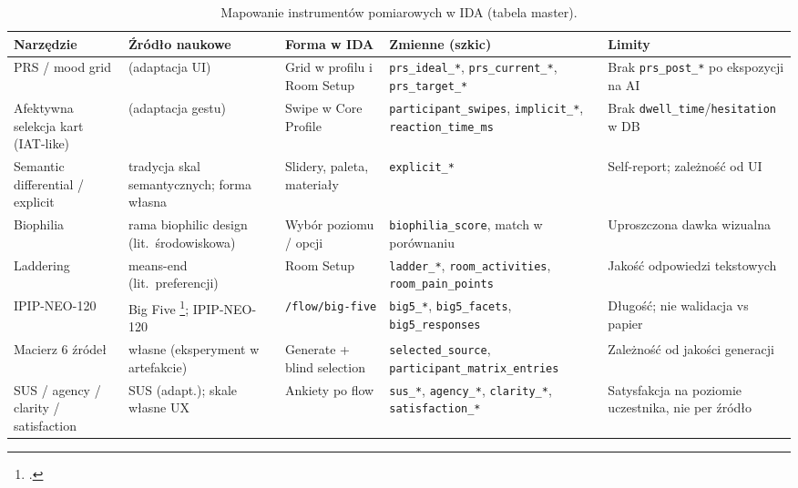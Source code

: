 \begin{table}[htbp]
  \centering
  \small
  \caption{Mapowanie instrumentów pomiarowych w IDA (tabela master).}
  \label{tab:ch06:instruments}
  \begin{tabular}{@{}p{2.2cm}p{2.6cm}p{3.0cm}p{2.8cm}p{2.8cm}@{}}
    \toprule
    Narzędzie & Źródło naukowe & Forma w IDA & Zmienne (szkic) & Limity \\
    \midrule
    PRS / mood grid &
      \textcite{hartig1997prs} (adaptacja UI) &
      Grid w profilu i Room Setup &
      \texttt{prs\_ideal\_*}, \texttt{prs\_current\_*}, \texttt{prs\_target\_*} &
      Brak \texttt{prs\_post\_*} po ekspozycji na AI \\
    \addlinespace
    Afektywna selekcja kart (IAT-like) &
      \textcite{greenwald1998iat} (adaptacja gestu) &
      Swipe w Core Profile &
      \texttt{participant\_swipes}, \texttt{implicit\_*}, \texttt{reaction\_time\_ms} &
      Brak \texttt{dwell\_time}/\texttt{hesitation} w DB \\
    \addlinespace
    Semantic differential / explicit &
      tradycja skal semantycznych; forma własna &
      Slidery, paleta, materiały &
      \texttt{explicit\_*} &
      Self-report; zależność od UI \\
    \addlinespace
    Biophilia &
      rama biophilic design (lit.\ środowiskowa) &
      Wybór poziomu / opcji &
      \texttt{biophilia\_score}, match w porównaniu &
      Uproszczona dawka wizualna \\
    \addlinespace
    Laddering &
      means-end (lit.\ preferencji) &
      Room Setup &
      \texttt{ladder\_*}, \texttt{room\_activities}, \texttt{room\_pain\_points} &
      Jakość odpowiedzi tekstowych \\
    \addlinespace
    IPIP-NEO-120 &
      Big Five \footcite{john2008bigfive}; IPIP-NEO-120 &
      \texttt{/flow/big-five} &
      \texttt{big5\_*}, \texttt{big5\_facets}, \texttt{big5\_responses} &
      Długość; nie walidacja vs papier \\
    \addlinespace
    Macierz 6 źródeł &
      własne (eksperyment w artefakcie) &
      Generate + blind selection &
      \texttt{selected\_source}, \texttt{participant\_matrix\_entries} &
      Zależność od jakości generacji \\
    \addlinespace
    SUS / agency / clarity / satisfaction &
      SUS (adapt.); skale własne UX &
      Ankiety po flow &
      \texttt{sus\_*}, \texttt{agency\_*}, \texttt{clarity\_*}, \texttt{satisfaction\_*} &
      Satysfakcja na poziomie uczestnika, nie per źródło \\
    \bottomrule
  \end{tabular}
\end{table}

